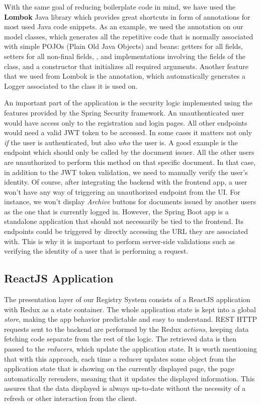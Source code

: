 With the same goal of reducing boilerplate code in mind, we have used the \textbf{Lombok} Java library which provides great shortcuts in form of annotations for most used Java code snippets. As an example, we used the  annotation on our model classes, which generates all the repetitive code that is normally associated with simple POJOs (Plain Old Java Objects) and beans: getters for all fields, setters for all non-final fields, ,  and  implementations involving the fields of the class, and a constructor that initializes all required arguments. Another feature that we used from Lombok is the  annotation, which automatically generates a Logger associated to the class it is used on.

An important part of the application is the security logic implemented using the features provided by the Spring Security framework. An unauthenticated user would have access only to the registration and login pages. All other endpoints would need a valid JWT token to be accessed. In some cases it matters not only \textit{if} the user is authenticated, but also \textit{who} the user is. A good example is the  endpoint which should only be called by the document issuer. All the other users are unauthorized to perform this method on that specific document. In that case, in addition to the JWT token validation, we need to manually verify the user's identity. Of course, after integrating the backend with the frontend app, a user won't have any way of triggering an unauthorized endpoint from the UI. For instance, we won't display \textit{Archive} buttons for documents issued by another users as the one that is currently logged in. However, the Spring Boot app is a standalone application that should not necessarily be tied to the frontend. Its endpoints could be triggered by directly accessing the URL they are associated with. This is why it is important to perform server-side validations such as verifying the identity of a user that is performing a request.



\subsection{ReactJS Application}
\label{subsection:reactJsApplication}

The presentation layer of our Registry System consists of a ReactJS application with Redux as a state container. The whole application state is kept into a global \textit{store}, making the app behavior predictable and easy to understand. REST HTTP requests sent to the backend are performed by the Redux \textit{actions}, keeping data fetching code separate from the rest of the logic. The retrieved data is then passed to the \textit{reducers}, which update the application state. It is worth mentioning that with this approach, each time a reducer updates some object from the application state that is showing on the currently displayed page, the page automatically rerenders, meaning that it updates the displayed information. This assures that the data displayed is always up-to-date without the necessity of a refresh or other interaction from the client.

